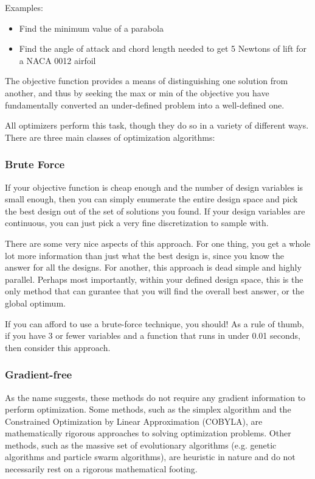 \documentclass[conf]{new-aiaa}
\begin{document}
        Examples: 
        \begin{itemize}
            \item Find the minimum value of a parabola
            \item Find the angle of attack and chord length needed to get 5 Newtons of lift for a NACA 0012 airfoil
        \end{itemize}

        The objective function provides a means of distinguishing one solution from another, 
        and thus by seeking the max or min of the objective you have fundamentally converted an under-defined problem into a well-defined one. 

        All optimizers perform this task, though they do so in a variety of different ways. 
        There are three main classes of optimization algorithms: 
        
        \subsubsection{Brute Force}
            If your objective function is cheap enough and the number of design variables is small enough, then you can simply enumerate the entire design space and pick the best design out of the set of solutions you found. 
            If your design variables are continuous, you can just pick a very fine discretization to sample with. 

            There are some very nice aspects of this approach. For one thing, you get a whole lot more information than just what the best design is, since you know the answer for all the designs. 
            For another, this approach is dead simple and highly parallel. 
            Perhaps most importantly, within your defined design space, this is the only method that can gurantee that you will find the overall best answer, or the global optimum. 

            If you can afford to use a brute-force technique, you should! As a rule of thumb, if you have 3 or fewer variables and a function that runs in under 0.01 seconds, then consider this approach. 

        \subsubsection{Gradient-free}
            As the name suggests, these methods do not require any gradient information to perform optimization.
            Some methods, such as the simplex algorithm and the Constrained Optimization by Linear Approximation (COBYLA), are mathematically rigorous approaches to solving optimization problems. 
            Other methods, such as the massive set of evolutionary algorithms (e.g. genetic algorithms and particle swarm algorithms), are heuristic in nature and do not necessarily rest on a rigorous mathematical footing. 
\end{document}
